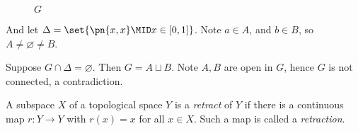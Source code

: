 \begin{solution}
\begin{enumerate}[label=(\arabic*)]
\begin{figure}[H]
        \caption{$G$}
        \label{fig:brouwer-1}
      \end{figure}
      And let $\Delta = \set{\pn{x,x} \MID x \in [0,1]}$. Note $a \in A$, and $b
      \in B$, so $A \neq \varnothing \neq B$.

      Suppose $G \cap \Delta = \varnothing$. Then $G = A \sqcup B$. Note $A,B$
      are open in $G$, hence $G$ is not connected, a contradiction.
  \end{enumerate}
\end{solution}

\begin{definition}[retract]
  A subspace $X$ of a topological space $Y$ is a \emph{retract} of $Y$ if there
  is a continuous map $r : Y \to Y$ with $r(x) = x$ for all $x \in X$. Such a
  map is called a \emph{retraction}.
\end{definition}



\begin{problem}

\end{problem}

